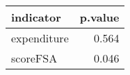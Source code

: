 \begin{table}[!h]
\centering
\begin{tabular}[t]{lr}
\toprule
indicator & p.value\\
\midrule
expenditure & 0.564\\
scoreFSA & 0.046\\
\bottomrule
\end{tabular}
\end{table}
